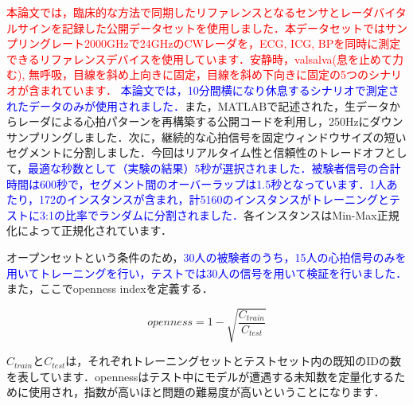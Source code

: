 \documentclass[dvipdfmx]{jsarticle}
\begin{document}
\textcolor{red}{本論文では，臨床的な方法で同期したリファレンスとなるセンサとレーダバイタルサインを記録した公開データセット\cite{dataset}を使用しました．本データセットではサンプリングレート2000GHzで24GHzのCWレーダを，ECG, ICG, BPを同時に測定できるリファレンスデバイスを使用しています．安静時，valsalva(息を止めて力む), 無呼吸，目線を斜め上向きに固定，目線を斜め下向きに固定の5つのシナリオが含まれています．}
\textcolor{blue}{本論文では，10分間横になり休息するシナリオで測定されたデータのみが使用されました．}また，MATLABで記述された，生データからレーダによる心拍パターンを再構築する公開コードを利用し，250Hzにダウンサンプリングしました．次に，継続的な心拍信号を固定ウィンドウサイズの短いセグメントに分割しました．今回はリアルタイム性と信頼性のトレードオフとして，\textcolor{blue}{最適な秒数として（実験の結果）5秒が選択されました．被験者信号の合計時間は600秒で，セグメント間のオーバーラップは1.5秒となっています．1人あたり，172のインスタンスが含まれ，計5160のインスタンスがトレーニングとテストに3:1の比率でランダムに分割されました．}各インスタンスはMin-Max正規化によって正規化されています．

オープンセットという条件のため，\textcolor{blue}{30人の被験者のうち，15人の心拍信号のみを用いてトレーニングを行い，テストでは30人の信号を用いて検証を行いました．}また，ここでopenness indexを定義する．

\begin{equation}\label{}
openness = 1 - \sqrt{\frac{C_{train}}{C_{test}}}
\end{equation}

$C_{train}とC_{test}$は，それぞれトレーニングセットとテストセット内の既知のIDの数を表しています．opennessはテスト中にモデルが遭遇する未知数を定量化するために使用され，指数が高いほと問題の難易度が高いということになります．
\end{document}
